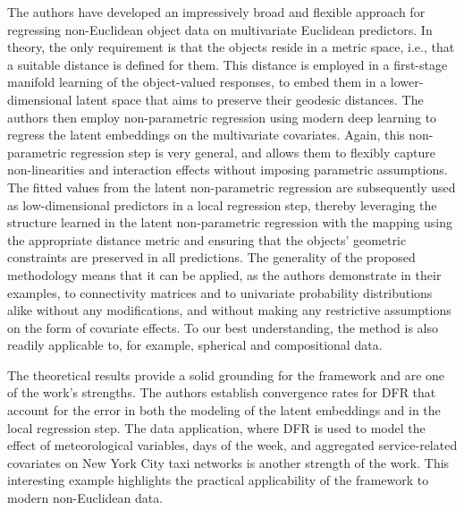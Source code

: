 
The authors have developed an impressively broad and flexible approach for regressing non-Euclidean object data on multivariate Euclidean predictors.
In theory, the only requirement is that the objects reside in a metric space, i.e., that a suitable distance is defined for them.
This distance is employed in a first-stage manifold learning of the object-valued responses, to embed them in a lower-dimensional latent space that aims to preserve their geodesic distances.
The authors then employ non-parametric regression using modern deep learning to regress the latent embeddings on the multivariate covariates.
Again, this non-parametric regression step is very general, and allows them to flexibly capture non-linearities and interaction effects without imposing parametric assumptions.
The fitted values from the latent non-parametric regression are subsequently used as low-dimensional predictors in a local \Frechet regression step, thereby leveraging the structure learned in the latent non-parametric regression with the \Frechet mapping using the appropriate distance metric and ensuring that the objects' geometric constraints are preserved in all predictions.
The generality of the proposed methodology means that it can be applied, as the authors demonstrate in their examples, to connectivity matrices and to univariate probability distributions alike without any modifications, and without making any restrictive assumptions on the form of covariate effects.
To our best understanding, the method is also readily applicable to, for example, spherical and compositional data.

The theoretical results provide a solid grounding for the framework and are one of the work's strengths.
The authors establish convergence rates for DFR that account for the error in both the modeling of the latent embeddings and in the local \Frechet regression step.
The data application, where DFR is used to model the effect of meteorological variables, days of the week, and aggregated service-related covariates on New York City taxi networks is another strength of the work.
This interesting example highlights the practical applicability of the framework to modern non-Euclidean data.
